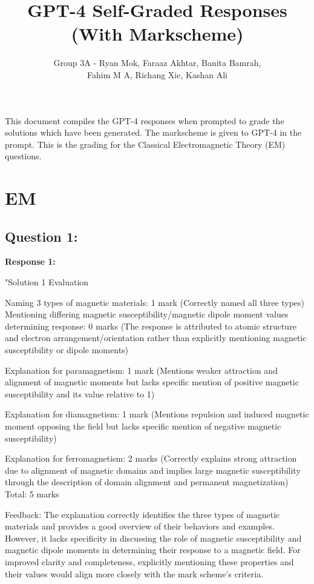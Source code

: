 \documentclass[a4paper,11pt]{article}
\begin{document}
\title{GPT-4 Self-Graded Responses (With Markscheme)}
\author{Group 3A - Ryan Mok, Faraaz Akhtar, Banita Bamrah, \\ Fahim M A, Richang Xie, Kashan Ali }
\date{}
\maketitle

This document compiles the GPT-4 responses when prompted to grade the solutions which have been generated. The markscheme is given to GPT-4 in the prompt. This is the grading for the Classical Electromagnetic Theory (EM) questions. 

\section{EM}

\subsection*{Question 1:}

\textbf{Response 1:}

"Solution 1 Evaluation

Naming 3 types of magnetic materials: 1 mark (Correctly named all three types)
Mentioning differing magnetic susceptibility/magnetic dipole moment values determining response: 0 marks (The response is attributed to atomic structure and electron arrangement/orientation rather than explicitly mentioning magnetic susceptibility or dipole moments)

Explanation for paramagnetism: 1 mark (Mentions weaker attraction and alignment of magnetic moments but lacks specific mention of positive magnetic susceptibility and its value relative to 1)

Explanation for diamagnetism: 1 mark (Mentions repulsion and induced magnetic moment opposing the field but lacks specific mention of negative magnetic susceptibility)

Explanation for ferromagnetism: 2 marks (Correctly explains strong attraction due to alignment of magnetic domains and implies large magnetic susceptibility through the description of domain alignment and permanent magnetization)
Total: 5 marks

Feedback: The explanation correctly identifies the three types of magnetic materials and provides a good overview of their behaviors and examples. However, it lacks specificity in discussing the role of magnetic susceptibility and magnetic dipole moments in determining their response to a magnetic field. For improved clarity and completeness, explicitly mentioning these properties and their values would align more closely with the mark scheme's criteria.
\end{document}
